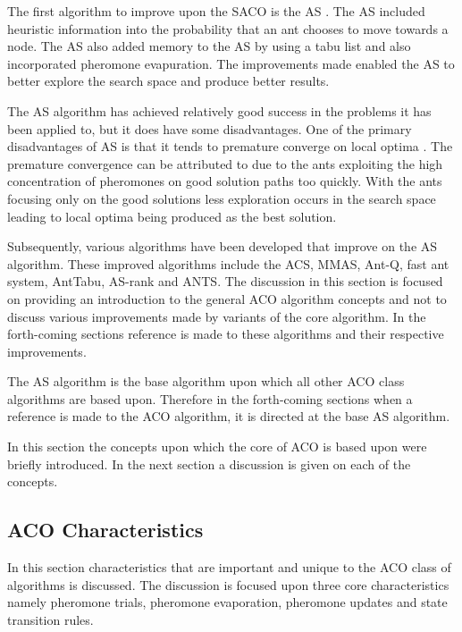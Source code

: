The first algorithm to improve upon the \gls{SACO} is the \gls{AS} \cite{CompuIntelligenceIntro,AntIntroTrends}. The \gls{AS} included heuristic information into the probability that an ant chooses to move towards a node. The \gls{AS} also added memory to the \gls{AS} by using a tabu list and also incorporated pheromone evapuration. The improvements made enabled the \gls{AS} to better explore the search space and produce better results\cite{CompuIntelligenceIntro,AntIntroTrends}. 

The \gls{AS} algorithm has achieved relatively good success in the problems it has been applied to, but it does have some disadvantages\cite{ImpACOComplex,ACOSurvey}. One of the primary disadvantages of \gls{AS} is that it tends to premature converge on local optima \cite{FundamentalSwarm,ImpACOComplex}. The premature convergence can be attributed to due to the ants exploiting the high concentration of pheromones on good solution paths too quickly\cite{FundamentalSwarm}. With the ants focusing only on the good solutions less exploration occurs in the search space leading to local optima being produced as the best solution\cite{FundamentalSwarm}.

Subsequently, various algorithms have been developed that improve on the \gls{AS} algorithm. These improved algorithms include the \gls{ACS}, \gls{MMAS}, Ant-Q, fast ant system, AntTabu, \gls{AS}-rank and \gls{ANTS}\cite{CompuIntelligenceIntro,AntIntroTrends}. The discussion in this section is focused on providing an introduction to the general \gls{ACO} algorithm concepts and not to discuss various improvements made by variants of the core algorithm. In the forth-coming sections reference is made to these algorithms and their respective improvements.

The \gls{AS} algorithm is the base algorithm upon which all other \gls{ACO} class algorithms are based upon. Therefore in the forth-coming sections when a reference is made to the \gls{ACO} algorithm, it is directed at the base \gls{AS} algorithm.

In this section the concepts  upon which the core of \gls{ACO} is based upon were briefly introduced. In the next section a discussion is given on each of the concepts.
\subsection{ACO Characteristics}
\label{sec:ACOcharacter}
In this section characteristics that are important and unique to the \gls{ACO} class of algorithms is discussed. The discussion is focused upon three core characteristics namely pheromone trials, pheromone evaporation, pheromone updates and state transition rules.
